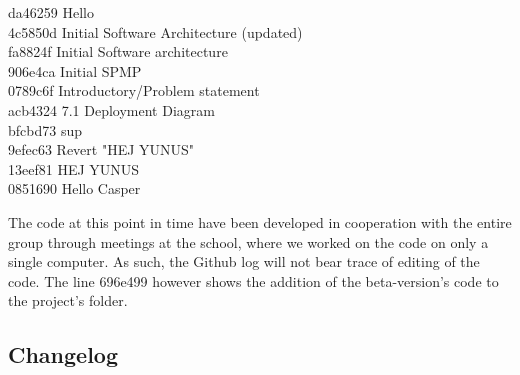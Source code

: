 \documentclass[12pt,a4paper]{article}
\begin{document}
da46259 Hello\\
4c5850d Initial Software Architecture (updated)\\
fa8824f Initial Software architecture\\
906e4ca Initial SPMP\\
0789c6f Introductory/Problem statement\\
acb4324 7.1 Deployment Diagram\\
bfcbd73 sup\\
9efec63 Revert "HEJ YUNUS"\\
13eef81 HEJ YUNUS\\
0851690 Hello Casper\\
\noindent\makebox[\linewidth]{\rule{16.5cm}{0.4pt}}

The code at this point in time have been developed in cooperation with the entire group through meetings at the school, where we worked on the code on only a single computer. As such, the Github log will not bear trace of editing of the code. The line 696e499 however shows the addition of the beta-version's code to the project's folder.
\newpage
\subsection{Changelog}
\end{document}
